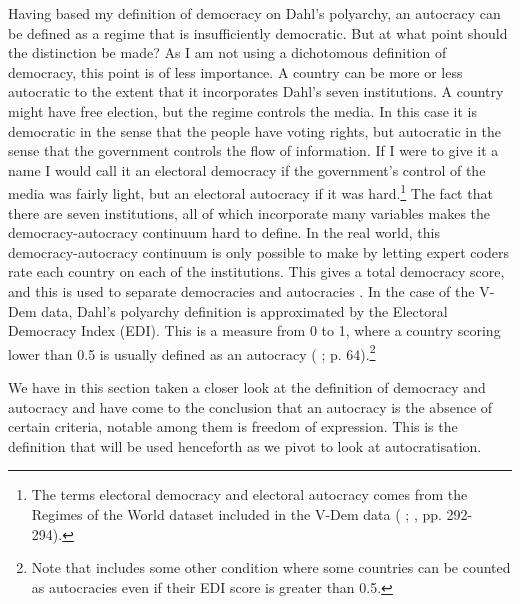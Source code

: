 Having based my definition of democracy on Dahl's polyarchy, an autocracy can be defined as a regime that is insufficiently democratic. But at what point should the distinction be made? As I am not using a dichotomous definition of democracy, this point is of less importance. A country can be more or less autocratic to the extent that it incorporates Dahl's seven institutions. A country might have free election, but the regime controls the media. In this case it is democratic in the sense that the people have voting rights, but autocratic in the sense that the government controls the flow of information. If I were to give it a name I would call it an electoral democracy if the government's control of the media was fairly light, but an electoral autocracy if it was hard.\footnote{The terms electoral democracy and electoral autocracy comes from the Regimes of the World dataset included in the V-Dem data (\citeauthor{coppedge_v-dem_2025} \citeyear{coppedge_v-dem_2025}; \citeauthor{coppedge_v-dem_2024-1} \citeyear{coppedge_v-dem_2024-1}, pp. 292-294).} The fact that there are seven institutions, all of which incorporate many variables makes the democracy-autocracy continuum hard to define. In the real world, this democracy-autocracy continuum is only possible to make by letting expert coders rate each country on each of the institutions. This gives a total democracy score, and this is used to separate democracies and autocracies \citep{economist_intelligence_unit_democracy_2024, marshall_polity5_2020, coppedge_v-dem_2024-1}. In the case of the V-Dem data, Dahl's polyarchy definition is approximated by the Electoral Democracy Index (EDI). This is a measure from 0 to 1, where a country scoring lower than 0.5 is usually defined as an autocracy (\citeauthor{lindberg_ordinal_2016} \citeyear{lindberg_ordinal_2016}; \citeauthor{luhrmann_regimes_2018} \citeyear{luhrmann_regimes_2018} p. 64).\footnote{Note that \citet{luhrmann_regimes_2018} includes some other condition where some countries can be counted as autocracies even if their EDI score is greater than 0.5.}

We have in this section taken a closer look at the definition of democracy and autocracy and have come to the conclusion that an autocracy is the absence of certain criteria, notable among them is freedom of expression. This is the definition that will be used henceforth as we pivot to look at autocratisation. 

